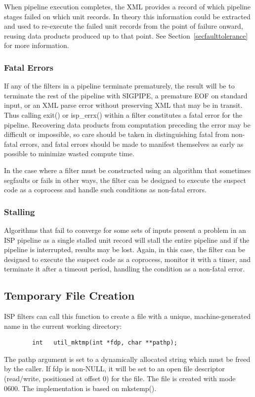 \documentclass{article}
\begin{document}
When pipeline execution completes, the XML provides a record of which pipeline 
stages failed on which unit records.  In theory this information
could be extracted and used to re-execute the failed unit records from the 
point of failure onward, reusing data products produced up to that point.
See Section~\ref{secfaulttolerance} for more information.

\subsubsection{Fatal Errors}

If any of the filters in a pipeline terminate prematurely, the result will
be to terminate the rest of the pipeline with SIGPIPE, a premature EOF on 
standard input, or an XML parse error without preserving XML that may be
in transit.  Thus calling exit() or isp\_errx() within a filter constitutes 
a fatal error for the pipeline.  
Recovering data products from computation preceding the error may be difficult 
or impossible, so care should be taken in distinguishing fatal from non-fatal 
errors, and fatal errors should be made to manifest themselves as early 
as possible to minimize wasted compute time.

In the case where a filter must be constructed using an algorithm that 
sometimes segfaults or fails in other ways, the filter can be designed to 
execute the suspect code as a coprocess and handle such conditions as 
non-fatal errors.

\subsubsection{Stalling}

Algorithms that fail to converge for some sets of inputs present a problem
in an ISP pipeline as a single stalled unit record will stall the entire
pipeline and if the pipeline is interrupted, results may be lost.  
Again, in this case, the filter can be designed to 
execute the suspect code as a coprocess, monitor it with a timer, and
terminate it after a timeout period, handling the condition as a 
non-fatal error.

\subsection{Temporary File Creation}

ISP filters can call this function to create a file with a unique, 
machine-generated name in the current working directory:
\begin{verbatim}
        int   util_mktmp(int *fdp, char **pathp);
\end{verbatim}
The pathp argument is set to a dynamically allocated string which must be 
freed by the caller.  If fdp is non-NULL, it will be set to an open
file descriptor (read/write, positioned at offset 0) for the file.
The file is created with mode 0600.  The implementation is based on mkstemp().
\end{document}
